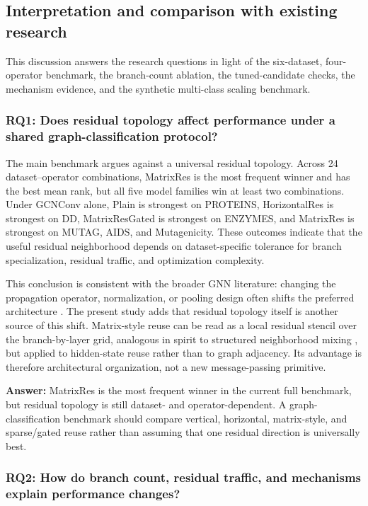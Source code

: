 \subsection{Interpretation and comparison with existing research}

This discussion answers the research questions in light of the six-dataset, four-operator benchmark, the branch-count ablation, the tuned-candidate checks, the mechanism evidence, and the synthetic multi-class scaling benchmark.

\subsubsection{RQ1: Does residual topology affect performance under a shared graph-classification protocol?}

The main benchmark argues against a universal residual topology. Across 24 dataset--operator combinations, MatrixRes is the most frequent winner and has the best mean rank, but all five model families win at least two combinations. Under GCNConv alone, Plain is strongest on PROTEINS, HorizontalRes is strongest on DD, MatrixResGated is strongest on ENZYMES, and MatrixRes is strongest on MUTAG, AIDS, and Mutagenicity. These outcomes indicate that the useful residual neighborhood depends on dataset-specific tolerance for branch specialization, residual traffic, and optimization complexity.

This conclusion is consistent with the broader GNN literature: changing the propagation operator, normalization, or pooling design often shifts the preferred architecture \cite{xu2019gin,hamilton2017inductive,velivckovic2017graph,ying2018hierarchical}. The present study adds that residual topology itself is another source of this shift. Matrix-style reuse can be read as a local residual stencil over the branch-by-layer grid, analogous in spirit to structured neighborhood mixing \cite{abu2019mixhop}, but applied to hidden-state reuse rather than to graph adjacency. Its advantage is therefore architectural organization, not a new message-passing primitive.

\textbf{Answer:} MatrixRes is the most frequent winner in the current full benchmark, but residual topology is still dataset- and operator-dependent. A graph-classification benchmark should compare vertical, horizontal, matrix-style, and sparse/gated reuse rather than assuming that one residual direction is universally best.

\subsubsection{RQ2: How do branch count, residual traffic, and mechanisms explain performance changes?}

